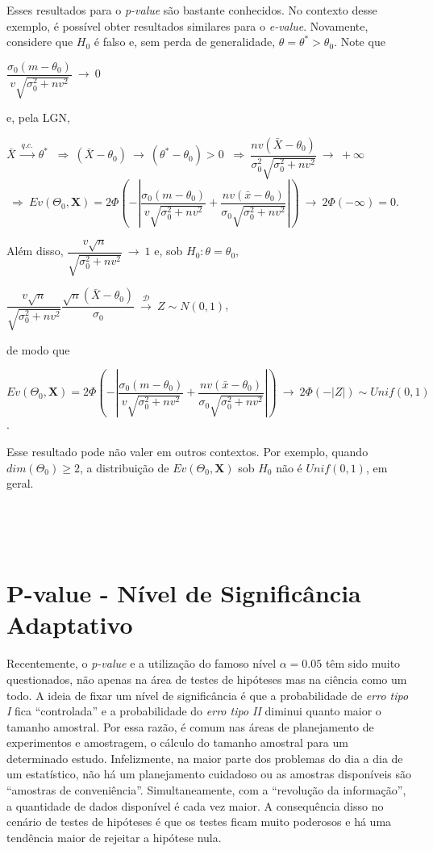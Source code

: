 \documentclass[
]{book}
\begin{document}
Esses resultados para o \emph{p-value} são bastante conhecidos. No contexto desse exemplo, é possível obter resultados similares para o \emph{e-value}. Novamente, considere que \(H_0\) é falso e, sem perda de generalidade, \(\theta=\theta^*>\theta_0\). Note que

\(\dfrac{{\sigma}_0(m-\theta_0)}{v\sqrt{{\sigma}_0^2+nv^2}} ~\longrightarrow~ 0\)

e, pela LGN,

\(\bar{X} ~\overset{q.c.}{\longrightarrow}~ \theta^*\)
\(~\Longrightarrow~ (\bar{X}-\theta_0) ~{\longrightarrow}~ (\theta^*-\theta_0) >0\)
\(~\Longrightarrow~ \dfrac{nv(\bar{X}-\theta_0)}{{\sigma}_0^2\sqrt{{\sigma}_0^2+nv^2}} ~{\longrightarrow}~ +\infty\)
\(~\Longrightarrow~ Ev(\Theta_0,\boldsymbol X)=2\Phi\left(-\left|\dfrac{{\sigma}_0(m-\theta_0)}{v{\sqrt{{\sigma}_0^2+nv^2}}}+\dfrac{nv(\bar x-\theta_0)}{{\sigma}_0{\sqrt{{\sigma}_0^2+nv^2}}}\right|\right) ~{\longrightarrow}~ 2\Phi\left(-\infty\right)=0\).

Além disso, \(\dfrac{v\sqrt{n}}{\sqrt{{\sigma}_0^2+nv^2}} ~\longrightarrow~ 1\) e, sob \(H_0: \theta = \theta_0\),

\(\dfrac{v\sqrt{n}}{\sqrt{{\sigma}_0^2+nv^2}}\dfrac{\sqrt{n}(\bar{X}-\theta_0)}{{\sigma}_0} ~\overset{\mathcal{D}}\longrightarrow~ Z \sim N(0,1)\),

de modo que

\(Ev(\Theta_0,\boldsymbol{X})=2\Phi\left(-\left|\dfrac{{\sigma}_0(m-\theta_0)}{v{\sqrt{{\sigma}_0^2+nv^2}}}+\dfrac{nv(\bar x-\theta_0)}{{\sigma}_0{\sqrt{{\sigma}_0^2+nv^2}}}\right|\right) ~{\longrightarrow}~ 2\Phi\left(-|Z|\right)\sim Unif(0,1)\).

Esse resultado pode não valer em outros contextos. Por exemplo, quando \(dim(\Theta_0)\geq 2\), a distribuição de \(Ev(\Theta_0,\boldsymbol{X})\) sob \(H_0\) não é \(Unif(0,1)\), em geral.

\(~\)

\(~\)

\hypertarget{p-value---nuxedvel-de-significuxe2ncia-adaptativo}{%
\section{P-value - Nível de Significância Adaptativo}\label{p-value---nuxedvel-de-significuxe2ncia-adaptativo}}

Recentemente, o \emph{p-value} e a utilização do famoso nível \(\alpha=0.05\) têm sido muito questionados, não apenas na área de testes de hipóteses mas na ciência como um todo. A ideia de fixar um nível de significância é que a probabilidade de \emph{erro tipo I} fica ``controlada'' e a probabilidade do \emph{erro tipo II} diminui quanto maior o tamanho amostral. Por essa razão, é comum nas áreas de planejamento de experimentos e amostragem, o cálculo do tamanho amostral para um determinado estudo. Infelizmente, na maior parte dos problemas do dia a dia de um estatístico, não há um planejamento cuidadoso ou as amostras disponíveis são ``amostras de conveniência''. Simultaneamente, com a ``revolução da informação'', a quantidade de dados disponível é cada vez maior. A consequência disso no cenário de testes de hipóteses é que os testes ficam muito poderosos e há uma tendência maior de rejeitar a hipótese nula.
\end{document}

